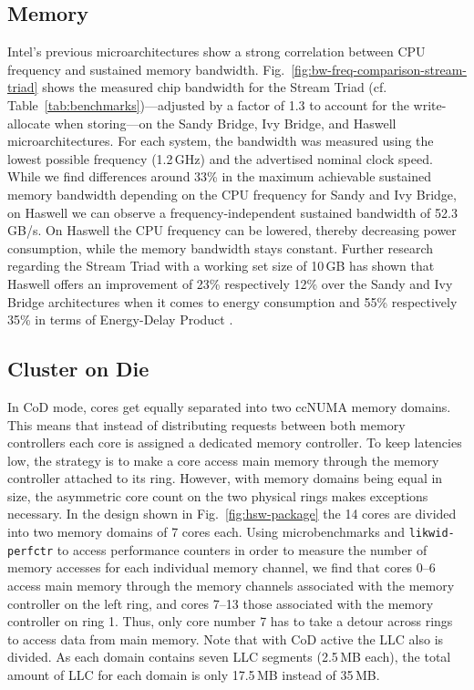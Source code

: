 \documentclass{llncs}
\begin{document}
\subsection{Memory}

Intel's previous microarchitectures show a strong correlation between
CPU frequency and sustained memory bandwidth.
Fig.~\ref{fig:bw-freq-comparison-stream-triad} shows the
measured chip bandwidth for the Stream Triad (cf.
Table~\ref{tab:benchmarks})---adjusted by a factor of 1.3 to account for the
write-allocate when storing---on the Sandy Bridge, Ivy Bridge, and Haswell
microarchitectures.  For each system, the bandwidth was measured using the
lowest possible frequency (1.2\,GHz) and the advertised nominal
clock speed. While we find differences around 33\% in the maximum achievable
sustained memory bandwidth depending on the CPU frequency for Sandy and Ivy
Bridge, on Haswell we can observe a frequency-independent sustained bandwidth
of 52.3\,GB/s. On Haswell the CPU frequency can be lowered, thereby decreasing
power consumption, while the memory bandwidth stays constant.
Further research regarding the Stream Triad with a working set size of 10\,GB has shown that
Haswell offers an improvement of 23\% respectively 12\% over the Sandy and Ivy
Bridge architectures when it comes to energy consumption and 55\% respectively
35\% in terms of Energy-Delay Product \cite{Hofmann:2015:1}.
\subsection{Cluster on Die}

In \ac{CoD} mode, cores get equally separated into two ccNUMA memory domains.
This means that instead of distributing requests between both memory
controllers each core is assigned a dedicated memory controller. To keep
latencies low, the strategy is to make a core access main memory through the
memory controller attached to its ring. However, with memory domains being
equal in size, the asymmetric core count on the two physical rings makes
exceptions necessary. In the design shown in Fig.~\ref{fig:hsw-package} the 14
cores are divided into two memory domains of 7 cores each.  Using
microbenchmarks and \texttt{likwid-perfctr} \cite{Treibig:2011:3} to access
performance counters in order to measure the number of memory accesses for each
individual memory channel, we find that cores 0--6 access main memory through
the memory channels associated with the memory controller on the left ring, and
cores 7--13 those associated with the memory controller on ring 1. Thus, only
core number 7 has to take a detour across rings to access data from main
memory. Note that with \ac{CoD} active the \ac{LLC} also is divided. As
each domain contains seven \ac{LLC} segments (2.5\,MB each), the total amount
of \ac{LLC} for each domain is only 17.5\,MB instead of 35\,MB.
\end{document}

